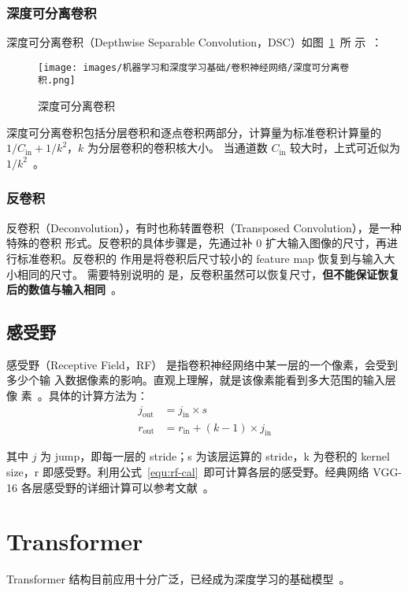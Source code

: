 \subsection{深度可分离卷积}\label{subsec:DSC}

深度可分离卷积（Depthwise Separable Convolution，DSC）如图~\ref{fig:ds-conv}~所
示~：

\begin{figure}[ht]
  \centering
  \texttt{[image: images/机器学习和深度学习基础/卷积神经网络/深度可分离卷积.png]}
  \caption{深度可分离卷积}\label{fig:ds-conv}
\end{figure}

深度可分离卷积包括分层卷积和逐点卷积两部分，计算量为标准卷积计算量的 $ 1 /
C_{\mathrm{in}} + 1/k^2 $，$k$ 为分层卷积的卷积核大小。
当通道数 $C_{\mathrm{in}}$ 较大时，上式可近似为 $1 /
k^2$~。

\subsection{反卷积}\label{subsec:deconv}
反卷积（Deconvolution），有时也称转置卷积（Transposed Convolution），是一种特殊的卷积
形式。反卷积的具体步骤是，先通过补 0 扩大输入图像的尺寸，再进行标准卷积。反卷积的
作用是将卷积后尺寸较小的 feature map 恢复到与输入大小相同的尺寸。 需要特别说明的
是，反卷积虽然可以恢复尺寸，\textbf{但不能保证恢复后的数值与输入相同}~。

\section{感受野}

感受野（Receptive Field，RF） 是指卷积神经网络中某一层的一个像素，会受到多少个输
入数据像素的影响。直观上理解，就是该像素能看到多大范围的输入层像
素~。具体的计算方法为：
\begin{align}
\label{equ:rf-cal}
j_{\mathrm {out}} & = j_{\mathrm{in}} \times s \\
r_{\mathrm {out}} & = r_{\mathrm{in}} + (k-1) \times j_{\mathrm{in}}
\end{align}

其中 $j$ 为 jump，即每一层的 stride；s 为该层运算的 stride，k 为卷积的 kernel
size，r 即感受野。利用公式~\eqref{equ:rf-cal}~即可计算各层的感受野。经典网络 VGG-16
各层感受野的详细计算可以参考文献~。

\chapter{Transformer}
Transformer 结构目前应用十分广泛，已经成为深度学习的基础模型~。

